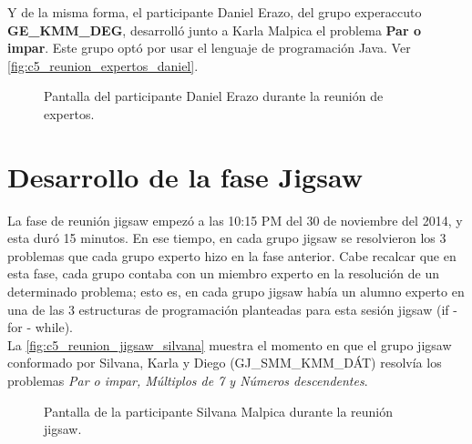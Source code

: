 Y de la misma forma, el participante Daniel Erazo, del grupo experaccuto \textbf{GE\_KMM\_DEG},  desarrolló junto a Karla Malpica el problema \textbf{Par o impar}. Este grupo optó por usar el lenguaje de programación Java. Ver \autoref{fig:c5_reunion_expertos_daniel}.

\begin{figure}
	\centering
	\caption[Reunión de Expertos - Daniel Erazo]{Pantalla del participante Daniel Erazo durante la reunión de expertos.}
	\label{fig:c5_reunion_expertos_daniel}
\end{figure}

\section{Desarrollo de la fase Jigsaw}
La fase de reunión jigsaw empezó a las 10:15 PM del 30 de noviembre del 2014, y esta duró 15 minutos. En ese tiempo, en cada grupo jigsaw se resolvieron los 3 problemas que cada grupo experto hizo en la fase anterior. Cabe recalcar que en esta fase, cada grupo contaba con un miembro experto en la resolución de un determinado problema; esto es, en cada grupo jigsaw había un alumno experto en una de las 3 estructuras de programación planteadas para esta sesión jigsaw (if - for - while).\\

La \autoref{fig:c5_reunion_jigsaw_silvana} muestra el momento en que el grupo jigsaw conformado por Silvana, Karla y Diego (GJ\_SMM\_KMM\_DÁT) resolvía los problemas \emph{Par o impar, Múltiplos de 7 y Números descendentes}.

\begin{figure}
	\centering
	\caption[Reunión Jigsaw - Silvana Malpica]{Pantalla de la participante Silvana Malpica durante la reunión jigsaw.}
	\label{fig:c5_reunion_jigsaw_silvana}
\end{figure}

